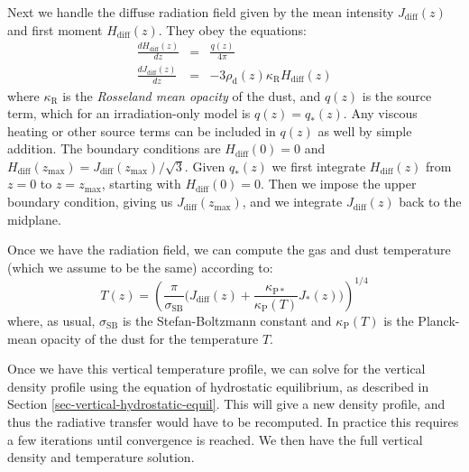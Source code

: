 \documentclass{book}
\begin{document}
Next we handle the diffuse radiation field given by the mean intensity $J_{\mathrm{diff}}(z)$
and first moment $H_{\mathrm{diff}}(z)$. They obey the equations:
\begin{eqnarray}
  \frac{dH_{\mathrm{diff}}(z)}{dz} &=&  \frac{q(z)}{4\pi} \label{eq-1d-mom1}\\
  \frac{dJ_{\mathrm{diff}}(z)}{dz} &=&  -3\rho_{\mathrm{d}}(z)\kappa_{\mathrm{R}}H_{\mathrm{diff}}(z) \label{eq-1d-mom0}
\end{eqnarray}
where $\kappa_{\mathrm{R}}$ is the {\em Rosseland mean opacity} of the dust, and
$q(z)$ is the source term, which for an irradiation-only model is
$q(z)=q_{*}(z)$. Any viscous heating or other source terms can be included in
$q(z)$ as well by simple addition.  The boundary conditions are
$H_{\mathrm{diff}}(0)=0$ and
$H_{\mathrm{diff}}(z_{\mathrm{max}})=J_{\mathrm{diff}}(z_{\mathrm{max}})/\sqrt{3}$. Given
$q_{*}(z)$ we first integrate $H_{\mathrm{diff}}(z)$ from $z=0$ to
$z=z_{\mathrm{max}}$, starting with $H_{\mathrm{diff}}(0)=0$. Then we impose the
upper boundary condition, giving us $J_{\mathrm{diff}}(z_{\mathrm{max}})$, and
we integrate $J_{\mathrm{diff}}(z)$ back to the midplane.

Once we have the radiation field, we can compute the gas and dust temperature (which we
assume to be the same) according to:
\begin{equation}\label{eq-t-afo-jmean}
T(z) = \left(\frac{\pi}{\sigma_{\mathrm{SB}}}\big(J_{\mathrm{diff}}(z)+\frac{\kappa_{\mathrm{P*}}}{\kappa_{\mathrm{P}}(T)}J_{*}(z)\big)\right)^{1/4}
\end{equation}
where, as usual, $\sigma_{\mathrm{SB}}$ is the Stefan-Boltzmann constant and
$\kappa_{\mathrm{P}}(T)$ is the Planck-mean opacity of the dust for the
temperature $T$.

Once we have this vertical temperature profile, we can solve for the vertical
density profile using the equation of hydrostatic equilibrium, as described in
Section \ref{sec-vertical-hydrostatic-equil}. This will give a new density
profile, and thus the radiative transfer would have to be recomputed. In
practice this requires a few iterations until convergence is reached. We then
have the full vertical density and temperature solution.
\end{document}
